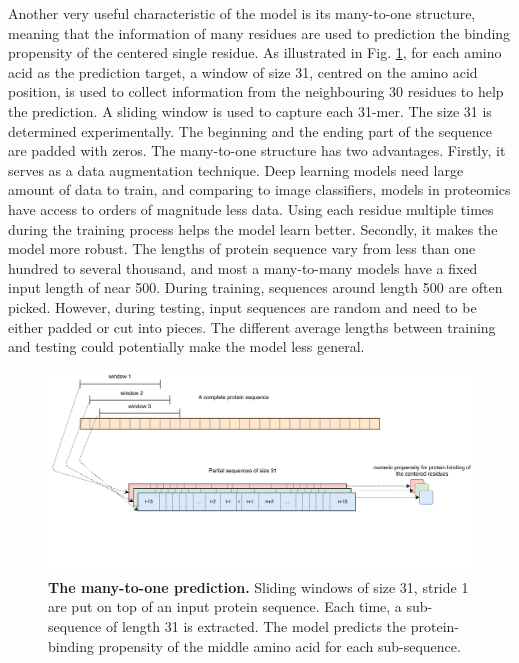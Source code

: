 \documentclass{bioinfo}
\begin{document}
\begin{methods}
Another very useful characteristic of the model is its many-to-one structure, meaning that the information of many residues are used to prediction the binding propensity of the centered single residue. As illustrated in Fig. \ref{fig_many2one}, for each amino acid as the prediction target, a window of size 31, centred on the amino acid position, is used to collect information from the neighbouring 30 residues to help the prediction. A sliding window is used to capture each 31-mer. The size 31 is determined experimentally. The beginning and the ending part of the sequence are padded with zeros. The many-to-one structure has two advantages. Firstly, it serves as a data augmentation technique. Deep learning models need large amount of data to train, and comparing to image classifiers, models in proteomics have access to orders of magnitude less data. Using each residue multiple times during the training process helps the model learn better. Secondly, it makes the model more robust. The lengths of protein sequence vary from less than one hundred to several thousand, and most a many-to-many models have a fixed input length of near 500. During training, sequences around length 500 are often picked. However, during testing, input sequences are random and need to be either padded or cut into pieces. The different average lengths between training and testing could potentially make the model less general. 
\begin{figure}
\centering
\includegraphics[width=\textwidth]{many_2_one.pdf}
  \caption{\textbf{The many-to-one prediction.} Sliding windows of size 31, stride 1 are put on top of an input protein sequence. Each time, a sub-sequence of length 31 is extracted. The model predicts the protein-binding propensity of the middle amino acid for each sub-sequence.
  \label{fig_many2one}}
\end{figure}


\end{methods}
\end{document}
